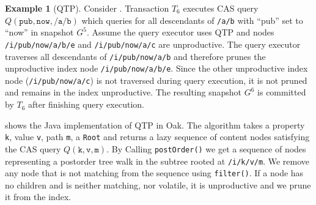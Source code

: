 \documentclass[abstracton,12pt]{scrartcl}
\theoremstyle{definition}
\newtheorem{example}{Example}
\begin{document}
\begin{example}[QTP]
  Consider . Transaction $T_6$ executes CAS query
  $Q(\texttt{pub},\texttt{now},\texttt{/a/b})$ which queries for all descendants
  of \texttt{/a/b} with ``pub'' set to ``now'' in snapshot $G^5$. Assume the
  query executor uses QTP and nodes \texttt{/i/pub/now/a/b/e} and
  \texttt{/i/pub/now/a/c} are unproductive. The
  query executor traverses all descendants of \texttt{/i/pub/now/a/b} and
  therefore prunes the unproductive index node \texttt{/i/pub/now/a/b/e}. Since
  the other unproductive index node (\texttt{/i/pub/now/a/c}) is not traversed
  during query execution,
  it is not pruned and remains in the index unproductive. The resulting
  snapshot $G^6$ is committed by $T_6$ after finishing query execution.
\end{example}

 shows the Java implementation of QTP in Oak. The algorithm
takes a property \texttt{k}, value \texttt{v}, path \texttt{m}, a
\texttt{Root} and returns a lazy sequence of content nodes satisfying
the CAS query $Q(\texttt{k},\texttt{v},\texttt{m})$. By Calling
\texttt{postOrder()} we get a sequence of nodes representing a
postorder tree walk in the subtree rooted at \texttt{/i/k/v/m}. We remove any
node that is not
matching from the sequence using \texttt{filter()}. If a node has no children
and is neither matching,
nor volatile, it is unproductive and we prune it from the index.

\vspace{1cm}
\end{document}
